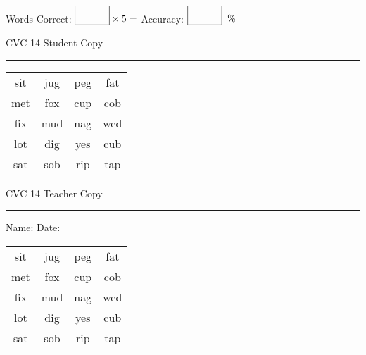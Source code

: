 \documentclass{memoir}
\begin{document}
\normalsize

Words Correct: $\fbox{\phantom{\huge 100}} \times 5 = $ Accuracy: $\fbox{\phantom{\huge 100}}\;\; \%$ 

\vfill

\newpage


\footnotesize \noindent
CVC 14 \hfill Student Copy
\smallskip
\hrule

\huge

\setlength{\tabcolsep}{14pt}
\def\arraystretch{2}

{\selectfont


\begin{vplace}[0.5]
\begin{center}
\begin{tabular}{cccc}
sit & jug & peg & fat \\
met & fox & cup & cob \\
fix & mud & nag & wed \\
lot & dig & yes & cub \\
sat & sob & rip & tap \\
\end{tabular}
\end{center}
\end{vplace}

}

\newpage

\footnotesize \noindent
CVC 14 \hfill Teacher Copy
\smallskip
\hrule

\normalsize

\vfill

\noindent
Name: \underline{\hspace{1.75in}} \hfill Date: \underline{\hspace{1in}}

\huge

{\selectfont


\begin{vplace}[0.5]
\begin{center}
\begin{tabular}{cccc}
sit & jug & peg & fat \\
met & fox & cup & cob \\
fix & mud & nag & wed \\
lot & dig & yes & cub \\
sat & sob & rip & tap \\
\end{tabular}
\end{center}
\end{vplace}



}
\end{document}
